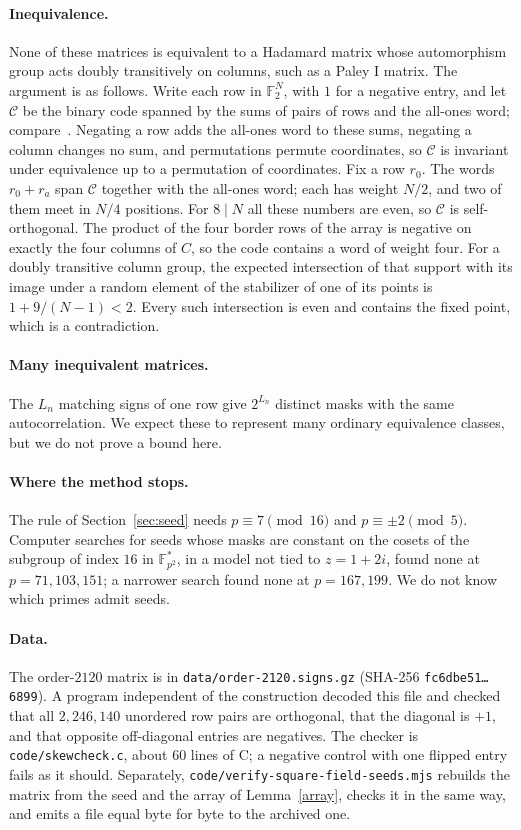 \documentclass[11pt]{article}
\theoremstyle{remark}
\newcommand{\F}{\mathbb F}
\begin{document}
\paragraph{Inequivalence.}
None of these matrices is equivalent to a Hadamard matrix whose automorphism group acts doubly transitively on columns, such as a Paley I matrix. The argument is as follows. Write each row in $\F_2^N$, with $1$ for a negative entry, and let $\mathcal C$ be the binary code spanned by the sums of pairs of rows and the all-ones word; compare~\cite{Orrick}. Negating a row adds the all-ones word to these sums, negating a column changes no sum, and permutations permute coordinates, so $\mathcal C$ is invariant under equivalence up to a permutation of coordinates. Fix a row $r_0$. The words $r_0+r_a$ span $\mathcal C$ together with the all-ones word; each has weight $N/2$, and two of them meet in $N/4$ positions. For $8\mid N$ all these numbers are even, so $\mathcal C$ is self-orthogonal. The product of the four border rows of the array is negative on exactly the four columns of $C$, so the code contains a word of weight four. For a doubly transitive column group, the expected intersection of that support with its image under a random element of the stabilizer of one of its points is $1+9/(N-1)<2$. Every such intersection is even and contains the fixed point, which is a contradiction.

\paragraph{Many inequivalent matrices.}
The $L_n$ matching signs of one row give $2^{L_n}$ distinct masks with the same autocorrelation. We expect these to represent many ordinary equivalence classes, but we do not prove a bound here.

\paragraph{Where the method stops.}
The rule of Section~\ref{sec:seed} needs $p\equiv7\pmod{16}$ and $p\equiv\pm2\pmod5$. Computer searches for seeds whose masks are constant on the cosets of the subgroup of index $16$ in $\F_{p^2}^*$, in a model not tied to $z=1+2i$, found none at $p=71,103,151$; a narrower search found none at $p=167,199$. We do not know which primes admit seeds.

\paragraph{Data.}
The order-$2120$ matrix is in \texttt{data/order-2120.signs.gz} (SHA-256 \texttt{fc6dbe51\ldots6899}). A program independent of the construction decoded this file and checked that all $2{,}246{,}140$ unordered row pairs are orthogonal, that the diagonal is $+1$, and that opposite off-diagonal entries are negatives. The checker is \texttt{code/skewcheck.c}, about 60 lines of C; a negative control with one flipped entry fails as it should. Separately, \texttt{code/verify-square-field-seeds.mjs} rebuilds the matrix from the seed and the array of Lemma~\ref{array}, checks it in the same way, and emits a file equal byte for byte to the archived one.
\end{document}
